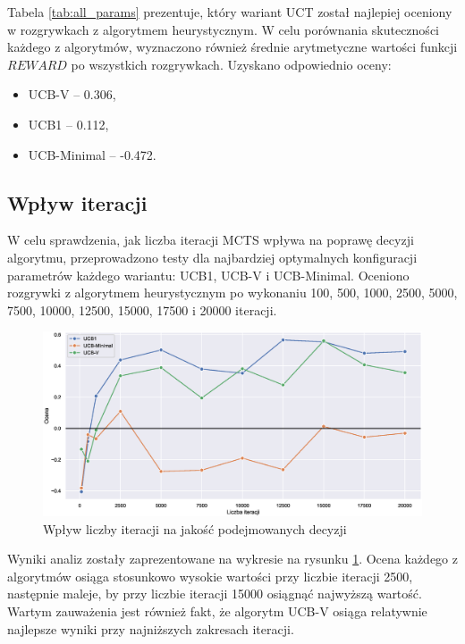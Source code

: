 \documentclass[a4paper,12pt]{article}
\begin{document}
Tabela \ref{tab:all_params} prezentuje, który wariant UCT został najlepiej oceniony w rozgrywkach z algorytmem heurystycznym. W celu porównania skuteczności każdego z algorytmów, wyznaczono również średnie arytmetyczne wartości funkcji $REWARD$ po wszystkich rozgrywkach. Uzyskano odpowiednio oceny:

\begin{itemize}
	\item UCB-V -- 0.306,
	\item UCB1 -- 0.112,
	\item UCB-Minimal -- -0.472.
\end{itemize}

\clearpage

\subsection{Wpływ iteracji}
W celu sprawdzenia, jak liczba iteracji MCTS wpływa na poprawę decyzji algorytmu, przeprowadzono testy dla najbardziej optymalnych konfiguracji parametrów każdego wariantu: UCB1, UCB-V i UCB-Minimal. Oceniono rozgrywki z algorytmem heurystycznym po wykonaniu 100, 500, 1000, 2500, 5000, 7500, 10000, 12500, 15000, 17500 i 20000 iteracji.

\begin{figure}[h]
	\centering
	\includegraphics[width=\textwidth]{iterations}
	\caption{Wpływ liczby iteracji na jakość podejmowanych decyzji}
	\label{rys:iterations}
\end{figure}

Wyniki analiz zostały zaprezentowane na wykresie na rysunku \ref{rys:iterations}. Ocena każdego z algorytmów osiąga stosunkowo wysokie wartości przy liczbie iteracji 2500, następnie maleje, by przy liczbie iteracji 15000 osiągnąć najwyższą wartość. Wartym zauważenia jest również fakt, że algorytm UCB-V osiąga relatywnie najlepsze wyniki przy najniższych zakresach iteracji.
\end{document}
